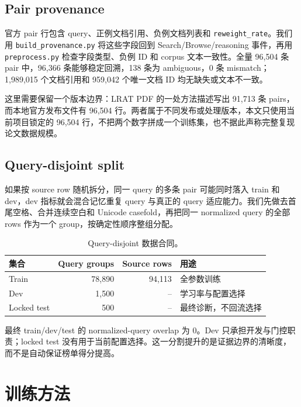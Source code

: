 \documentclass[UTF8,10pt,a4paper,twocolumn]{ctexart}
\begin{document}
\subsection{Pair provenance}

官方 pair 行包含 query、正例文档引用、负例文档列表和 \texttt{reweight\_rate}。我们用 \texttt{build\_provenance.py} 将这些字段回到 Search/Browse/reasoning 事件，再用 \texttt{preprocess.py} 检查字段类型、负例 ID 和 corpus 文本一致性。全量 96,504 条 pair 中，96,366 条能够稳定回溯，138 条为 ambiguous，0 条 mismatch；1,989,015 个文档引用和 959,042 个唯一文档 ID 均无缺失或文本不一致。

这里需要保留一个版本边界：LRAT PDF 的一处方法描述写出 91,713 条 pairs，而本地官方发布文件有 96,504 行。两者属于不同发布或处理版本，本文只使用当前项目锁定的 96,504 行，不把两个数字拼成一个训练集，也不据此声称完整复现论文数据规模。

\subsection{Query-disjoint split}

如果按 source row 随机拆分，同一 query 的多条 pair 可能同时落入 train 和 dev，dev 指标就会混合记忆重复 query 与真正的 query 适应能力。我们先做去首尾空格、合并连续空白和 Unicode casefold，再把同一 normalized query 的全部 rows 作为一个 group，按确定性顺序整组分配。

\begin{table}[t]
\centering
\caption{Query-disjoint 数据合同。}
\label{tab:split}
\small
\begin{tabular}{lrrp{6.3cm}}
\toprule
集合 & Query groups & Source rows & 用途\\
\midrule
Train & 78,890 & 94,113 & 全参数训练\\
Dev & 1,500 & -- & 学习率与配置选择\\
Locked test & 500 & -- & 最终诊断，不回流选择\\
\bottomrule
\end{tabular}
\end{table}

最终 train/dev/test 的 normalized-query overlap 为 0。Dev 只承担开发与门控职责；locked test 没有用于当前配置选择。这一分割提升的是证据边界的清晰度，而不是自动保证榜单得分提高。

\section{训练方法}
\end{document}
